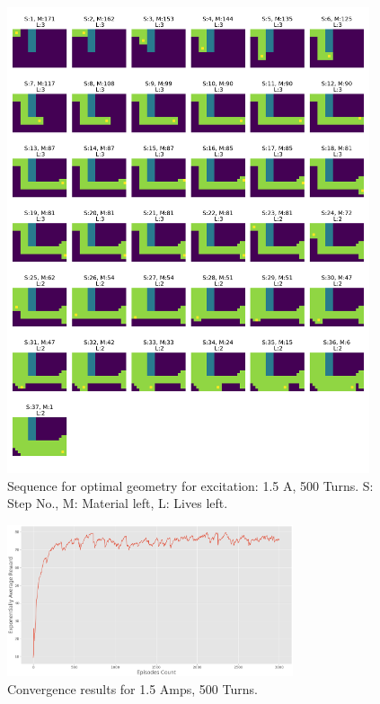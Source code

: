 \begin{figure}[h!]
    \centering
    \includegraphics[width=0.95\textwidth]{Figures/Ch_RL/1.50_Count179_NetForce88.02.png}
    \caption{Sequence for optimal geometry for excitation: 1.5 A, 500 Turns. S: Step No., M: Material left, L: Lives left.}
    \label{fig:RL_Ccore_1.5A_sequence}
\end{figure}

\clearpage
\newpage

\begin{figure}[h!]
    \centering
    \includegraphics[width=0.75\textwidth]{Figures/Ch_RL/1.5A_A2C.png}
    \caption{Convergence results for 1.5 Amps, 500 Turns.}
    \label{fig:RL_convergence_750AT}
\end{figure}

